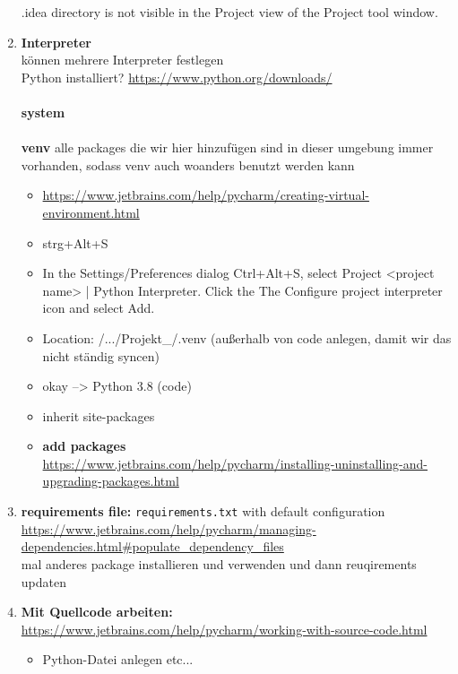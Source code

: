 \begin{enumerate}
	      .idea directory is not visible in the Project view of the Project tool window.
	\item \textbf{Interpreter}\\
	      können mehrere Interpreter festlegen\\
	      Python installiert? \url{https://www.python.org/downloads/}~\\~\\
	      \textbf{system}\\~\\
	      \textbf{venv}
	      alle packages die wir hier hinzufügen sind in dieser umgebung immer vorhanden, sodass venv auch woanders benutzt werden kann
	      \begin{itemize}
		      \item \url{https://www.jetbrains.com/help/pycharm/creating-virtual-environment.html}
		      \item strg+Alt+S
		      \item In the Settings/Preferences dialog Ctrl+Alt+S, select Project <project name> | Python Interpreter. Click the The Configure project interpreter icon and select Add.
		      \item Location: /.../Projekt\_/.venv  (außerhalb von code anlegen, damit wir das nicht ständig syncen)
		      \item okay --> Python 3.8 (code)
		      \item inherit site-packages
		      \item \textbf{add packages}\\
		            \url{https://www.jetbrains.com/help/pycharm/installing-uninstalling-and-upgrading-packages.html}\\
	      \end{itemize}
	\item \textbf{requirements file:} \texttt{requirements.txt} with default configuration\\
	      \url{https://www.jetbrains.com/help/pycharm/managing-dependencies.html#populate_dependency_files}\\
	      mal anderes package installieren und verwenden und dann reuqirements updaten
	\item \textbf{Mit Quellcode arbeiten:}\\ \url{https://www.jetbrains.com/help/pycharm/working-with-source-code.html}\\
	      \begin{itemize}
		      \item Python-Datei anlegen etc...

\end{itemize}
\end{enumerate}

